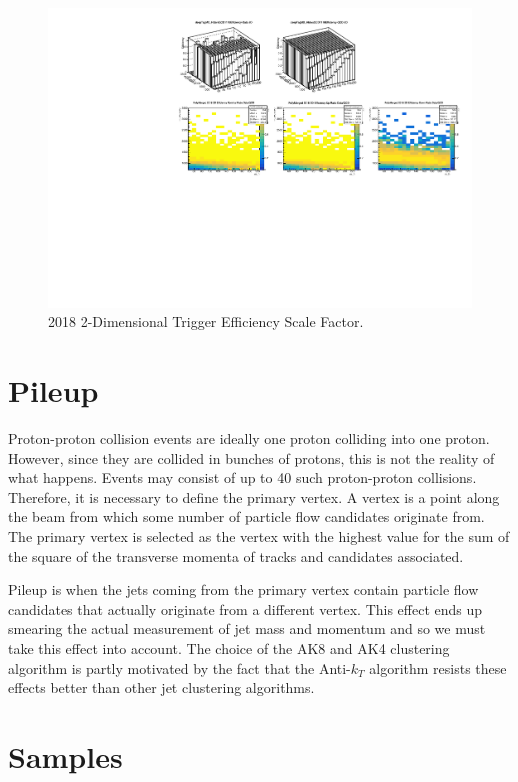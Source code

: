 \begin{figure}[!htb]
	\centering
	\includegraphics[width=1.0\textwidth]{Figures/2018triggerMaps.pdf}
	\caption{2018 2-Dimensional Trigger Efficiency Scale Factor.}
	\label{fig:fig_3-6}
\end{figure}
\clearpage

\section{Pileup}

Proton-proton collision events are ideally one proton colliding into one proton. 
However, since they are collided in bunches of protons, this is not the reality of what happens.
Events may consist of up to 40 such proton-proton collisions. Therefore, it is necessary to define the primary vertex.
A vertex is a point along the beam from which some number of particle flow candidates originate from.
The primary vertex is selected as the vertex with the highest value for the sum of the square of the transverse momenta of tracks and candidates associated.

Pileup is when the jets coming from the primary vertex contain particle flow candidates that actually originate from a different vertex.
This effect ends up smearing the actual measurement of jet mass and momentum and so we must take this effect into account.
The choice of the AK8 and AK4 clustering algorithm is partly motivated by the fact that the Anti-$k_T$ algorithm resists these effects better than other jet clustering algorithms.

\section{Samples}

